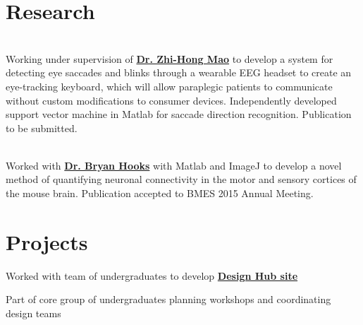 \documentclass[]{deedy-resume-openfont}
\begin{document}
\hfill
\begin{minipage}[t]{0.66\textwidth} 


\section{Research}
 \\
Working under supervision of \textbf{\href{http://www.pitt.edu/~zhm4/}{Dr. Zhi-Hong Mao}} to develop a system for detecting eye saccades and blinks through a wearable EEG headset to create an eye-tracking keyboard, which will allow paraplegic patients to communicate without custom modifications to consumer devices. Independently developed support vector machine in Matlab for saccade direction recognition. Publication to be submitted.
\sectionsep

 \\
Worked with \textbf{\href{http://hookslab.neurobio.pitt.edu/}{Dr. Bryan Hooks}} with Matlab and ImageJ to develop a novel method of quantifying neuronal connectivity in the motor and sensory cortices of the mouse brain. Publication accepted to BMES 2015 Annual Meeting.
\sectionsep


\section{Projects}

\vspace{\topsep} %
\begin{tightemize}\item Worked with team of undergraduates to develop \textbf{\href{http://pittdesignhub.com}{Design Hub site}}
\item Part of core group of undergraduates planning workshops and coordinating design teams
\end{tightemize}
\sectionsep


\end{minipage}
\end{document}
